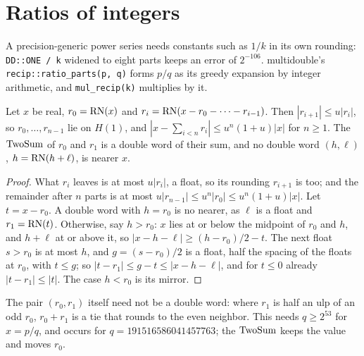 
\section{Ratios of integers}\label{sec:recip}

A precision-generic power series needs constants such as $1/k$ in its own rounding: \texttt{DD::ONE / k} widened to
eight parts keeps an error of $2^{-106}$. multidouble's \texttt{recip::ratio\_parts(p, q)} forms $p/q$ as its greedy
expansion by integer arithmetic, and \texttt{mul\_recip(k)} multiplies by it.

\begin{lemma}\label{lem:greedy}
Let $x$ be real, $r_0 = \mathrm{RN}(x)$ and $r_i = \mathrm{RN}(x - r_0 - \dots - r_{i-1})$. Then $|r_{i+1}| \le u|r_i|$, so $r_0,
\dots, r_{n-1}$ lie on $H(1)$, and $|x - \sum_{i<n} r_i| \le u^n(1 + u)|x|$ for $n \ge 1$. The $\mathrm{TwoSum}$ of $r_0$ and
$r_1$ is a double word of their sum, and no double word $(h, \ell)$, $h = \mathrm{RN}(h + \ell)$, is nearer $x$.
\end{lemma}

\begin{proof}
What $r_i$ leaves is at most $u|r_i|$, a float, so its rounding $r_{i+1}$ is too; and the remainder after $n$ parts
is at most $u|r_{n-1}| \le u^n|r_0| \le u^n(1+u)|x|$. Let $t = x - r_0$. A double word with $h = r_0$ is no nearer,
as $\ell$ is a float and $r_1 = \mathrm{RN}(t)$. Otherwise, say $h > r_0$: $x$ lies at or below the midpoint of $r_0$ and $h$,
and $h + \ell$ at or above it, so $|x - h - \ell| \ge (h - r_0)/2 - t$. The next float $s > r_0$ is at most $h$, and
$g = (s - r_0)/2$ is a float, half the spacing of the floats at $r_0$, with $t \le g$; so $|t - r_1| \le g - t \le
|x - h - \ell|$, and for $t \le 0$ already $|t - r_1| \le |t|$. The case $h < r_0$ is its mirror.
\end{proof}

The pair $(r_0, r_1)$ itself need not be a double word: where $r_1$ is half an ulp of an odd $r_0$, $r_0 + r_1$ is a
tie that rounds to the even neighbor. This needs $q \ge 2^{53}$ for $x = p/q$, and occurs for $q = 191516586041457763$;
the $\mathrm{TwoSum}$ keeps the value and moves $r_0$.


